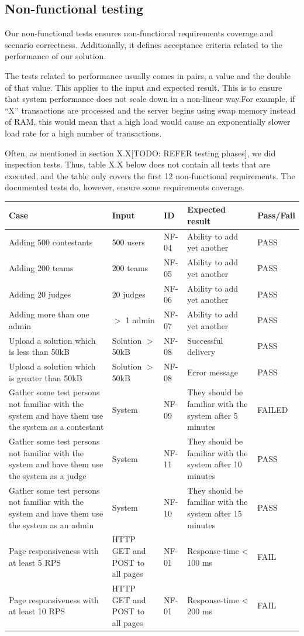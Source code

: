 \subsection{Non-functional testing}
Our non-functional tests ensures non-functional requirements coverage
and scenario correctness. Additionally, it defines acceptance criteria
related to the performance of our solution.

The tests related to performance usually comes in pairs, a value and the
double of that value. This applies to the input and expected result.
This is to ensure that system performance does not scale down in a
non-linear way.For example, if ``X''
transactions are processed and the server begins using swap memory
instead of RAM, this would mean that a high load would cause an
exponentially slower load rate for a high number of transactions.

Often, as mentioned in section X.X[TODO: REFER testing phases], we did
inspection tests. Thus, table X.X below does not contain all tests that
are executed, and the table only covers the first 12 non-functional
requirements. The documented tests do, however, ensure some
requirements coverage.

\begin{tabular}{|p{4.3cm}|p{2.0cm}|l|p{3.8cm}|l|}
\hline
Case & Input & ID & Expected result & Pass/Fail\\
\hline
Adding 500 contestants & 500 users & NF-04 & Ability to add yet another & PASS\\
\hline
Adding 200 teams & 200 teams & NF-05 & Ability to add yet another & PASS\\
\hline
Adding 20 judges & 20 judges & NF-06 & Ability to add yet another &
PASS\\
\hline
Adding more than one admin &
$>$ 1 admin & NF-07 & Ability to add yet another & PASS\\
\hline
Upload a solution which is less than 50kB & Solution $>$ 50kB & NF-08 & Successful delivery & PASS\\
\hline
Upload a solution which is greater than 50kB & Solution $>$ 50kB & NF-08 & Error message & PASS\\
\hline
Gather some test persons not familiar with the system and have them use the
system as a contestant & System & NF-09 & They should be familiar with the
system after 5 minutes & FAILED\\
\hline
Gather some test persons not familiar with the system and have them use the
system as a judge & System & NF-11 & They should be familiar with the system
after 10 minutes & PASS\\
\hline
Gather some test persons not familiar with the system and have them use the
system as an admin & System & NF-10 & They should be familiar with the system
after 15 minutes & PASS\\
\hline
Page responsiveness with at least 5 RPS & HTTP GET and POST to all pages &
NF-01 & Response-time {\textless} 100 ms & FAIL\\
\hline
Page responsiveness with at least 10 RPS & HTTP GET and POST to all pages &
NF-01 & Response-time {\textless} 200 ms & FAIL\\
\hline
\end{tabular}


